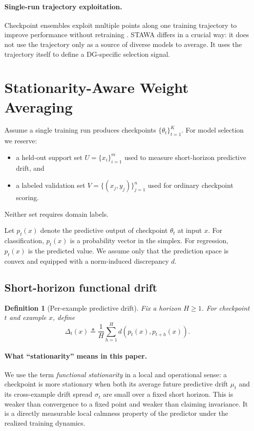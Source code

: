 \documentclass{article}
\newtheorem{definition}{Definition}
\newcommand{\stawa}{\textup{\textsc{STAWA}}}
\begin{document}
\paragraph{Single-run trajectory exploitation.}
Checkpoint ensembles exploit multiple points along one training trajectory to improve performance without retraining \citep{chen2017checkpoint}. \stawa{} differs in a crucial way: it does not use the trajectory only as a source of diverse models to average. It uses the trajectory itself to define a DG-specific selection signal.

\section{Stationarity-Aware Weight Averaging}
\label{sec:method}

Assume a single training run produces checkpoints $\{\theta_t\}_{t=1}^{K}$. For model selection we reserve:
\begin{itemize}[leftmargin=1.4em]
    \item a held-out support set $U = \{x_i\}_{i=1}^{m}$ used to measure short-horizon predictive drift, and
    \item a labeled validation set $V = \{(x_j,y_j)\}_{j=1}^{n}$ used for ordinary checkpoint scoring.
\end{itemize}
Neither set requires domain labels.

Let $p_t(x)$ denote the predictive output of checkpoint $\theta_t$ at input $x$. For classification, $p_t(x)$ is a probability vector in the simplex. For regression, $p_t(x)$ is the predicted value. We assume only that the prediction space is convex and equipped with a norm-induced discrepancy $d$.

\subsection{Short-horizon functional drift}

\begin{definition}[Per-example predictive drift]
Fix a horizon $H \ge 1$. For checkpoint $t$ and example $x$, define
\begin{equation}
    \Delta_t(x)
    \triangleq
    \frac{1}{H}\sum_{h=1}^{H} d\!\left(p_t(x), p_{t+h}(x)\right).
    \label{eq:delta}
\end{equation}
\end{definition}

\paragraph{What ``stationarity'' means in this paper.}
We use the term \emph{functional stationarity} in a local and operational sense: a checkpoint is more stationary when both its average future predictive drift $\mu_t$ and its cross-example drift spread $\sigma_t$ are small over a fixed short horizon. This is weaker than convergence to a fixed point and weaker than claiming invariance. It is a directly measurable local calmness property of the predictor under the realized training dynamics.
\end{document}
